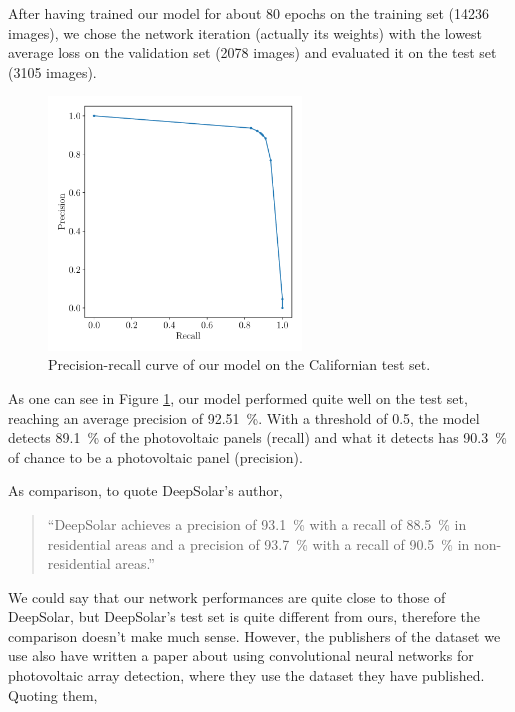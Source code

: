 \documentclass[a4paper, 12pt]{article}
\begin{document}
After having trained our model for about 80 epochs on the training set (\num{14236} images), we chose the network iteration (actually its weights) with the lowest average loss on the validation set (\num{2078} images) and evaluated it on the test set (\num{3105} images).

\begin{figure}[h]
    \centering
    \includegraphics[width=0.6\textwidth]{resources/pdf/precision_recall.pdf}
    \vspace{-1em}
    \caption{Precision-recall curve of our model on the Californian test set.}
    \label{fig:precision_recall}
\end{figure}

As one can see in Figure \ref{fig:precision_recall}, our model performed quite well on the test set, reaching an average precision of \SI{92.51}{\percent}. With a threshold of \num{0.5}, the model detects \SI{89.1}{\percent} of the photovoltaic panels (recall) and what it detects has \SI{90.3}{\percent} of chance to be a photovoltaic panel (precision).

As comparison, to quote DeepSolar's author,

\begin{quote}
    \enquote{DeepSolar achieves a precision of \SI{93.1}{\percent} with a recall of \SI{88.5}{\percent} in residential areas and a precision of \SI{93.7}{\percent} with a recall of \SI{90.5}{\percent} in non-residential areas.}
\end{quote}

We could say that our network performances are quite close to those of DeepSolar, but DeepSolar's test set is quite different from ours, therefore the comparison doesn't make much sense. However, the publishers of the dataset we use also have written a paper \parencite{malof2016deep} about using convolutional neural networks for photovoltaic array detection, where they use the dataset they have published. Quoting them,
\end{document}
